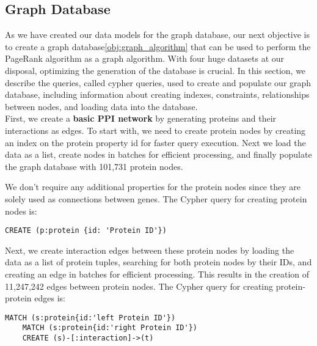 \subsection{Graph Database} \label{subsec:graph_database}

As we have created our data models for the graph database, our next objective is to create a graph database\ref{obj:graph_algorithm}
that can be used to perform the PageRank algorithm as a graph algorithm.
With four huge datasets at our disposal, optimizing the generation of the database is crucial.
In this section, we describe the queries, called cypher queries, used to create and populate our graph database,
including information about creating indexes, constraints, relationships between nodes, and loading data into the database.\\


First, we create a \textbf{basic PPI network} by generating proteins and their interactions as edges.
To start with, we need to create protein nodes by creating an index on the protein property id for faster query execution.
Next we load the data as a list, create nodes in batches for efficient processing,
and finally populate the graph database with 101,731 protein nodes.

We don't require any additional properties for the protein nodes since they are solely used as connections between genes.
The Cypher query for creating protein nodes is:

\begin{lstlisting}[language=Cypher, label={lst:protein_nodes}]
    CREATE (p:protein {id: 'Protein ID'})
\end{lstlisting}

Next, we create interaction edges between these protein nodes by loading the data as a list of protein tuples,
searching for both protein nodes by their IDs, and creating an edge in batches for efficient processing.
This results in the creation of 11,247,242 edges between protein nodes.
The Cypher query for creating protein-protein edges is:

\begin{lstlisting}[language=Cypher, label={lst:protein_edges}]
    MATCH (s:protein{id:'left Protein ID'})
    MATCH (s:protein{id:'right Protein ID'})
    CREATE (s)-[:interaction]->(t)
\end{lstlisting}

